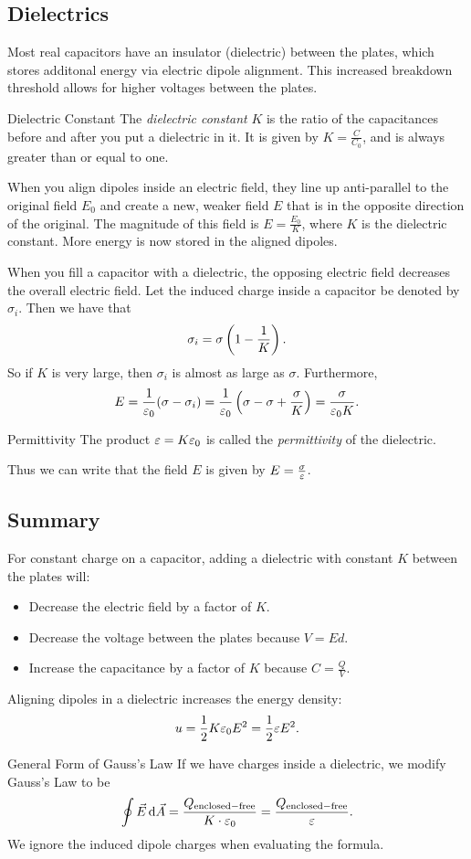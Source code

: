 \documentclass[class=article, crop=false]{standalone}
\begin{document}
  \subsection{Dielectrics}
  Most real capacitors have an insulator (dielectric) between the plates, which stores additonal energy via electric dipole alignment. This increased breakdown threshold allows for higher voltages between the plates.
  \begin{definition}{Dielectric Constant}
    The \emph{dielectric constant} $K$ is the ratio of the capacitances before and after you put a dielectric in it. It is given by $K = \frac{C}{C_0}$, and is always greater than or equal to one.
  \end{definition}
  \begin{note}{}
    When you align dipoles inside an electric field, they line up anti-parallel to the original field $E_0$ and create a new, weaker field $E$ that is in the opposite direction of the original. The magnitude of this field is $E = \frac{E_0}{K}$, where $K$ is the dielectric constant. More energy is now stored in the aligned dipoles. 
  \end{note}
  When you fill a capacitor with a dielectric, the opposing electric field decreases the overall electric field. Let the induced charge inside a capacitor be denoted by $\sigma_i$. Then we have that 
  \[
    \sigma_i = \sigma \left( 1 - \frac{1}{K} \right).
  \]
  So if $K$ is very large, then $\sigma_i$ is almost as large as $\sigma$. Furthermore, 
  \[
    E = \frac{1}{\varepsilon_0}(\sigma - \sigma_i) = \frac{1}{\varepsilon_0}\left( \sigma -\sigma + \frac{\sigma}{K} \right) = \frac{\sigma}{\varepsilon_0K}.
  \]
  \begin{definition}{Permittivity}
    The product $\varepsilon = K\varepsilon_0$ is called the \emph{permittivity} of the dielectric.
  \end{definition}
  Thus we can write that the field $E$ is given by $E = \frac{\sigma}{\varepsilon}$.
  \subsection{Summary}
  For constant charge on a capacitor, adding a dielectric with constant $K$ between the plates will:
  \begin{itemize}
    \item Decrease the electric field by a factor of $K$.
    \item Decrease the voltage between the plates because $V = Ed$.
    \item Increase the capacitance by a factor of $K$ because $C = \frac{Q}{V}$.
  \end{itemize}
  Aligning dipoles in a dielectric increases the energy density:
  \[
    u = \frac{1}{2}K\varepsilon_0 E^2 = \frac{1}{2}\varepsilon E^2.
  \]
  \begin{theorem}{General Form of Gauss's Law}
    If we have charges inside a dielectric, we modify Gauss's Law to be
    \[
      \oint \vec{E}\,\mathrm{d}\vec{A} = \frac{Q_{\text{enclosed}-\text{free}}}{K\cdot \varepsilon_0} = \frac{Q_{\text{enclosed}-\text{free}}}{\varepsilon}.
    \]
    We ignore the induced dipole charges when evaluating the formula.
  \end{theorem}
\end{document}
